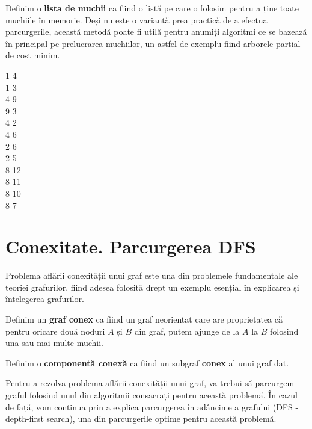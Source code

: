 \begin{definition}
    Definim o \textbf{lista de muchii} ca fiind o listă pe care o folosim pentru a ține toate muchiile în memorie. Deși nu este o variantă prea practică de a efectua parcurgerile, această metodă poate fi utilă pentru anumiți algoritmi ce se bazează în principal pe prelucrarea muchiilor, un astfel de exemplu fiind arborele parțial de cost minim. 
\end{definition}

\begin{raggedright}
1 4\\
1 3\\
4 9\\
9 3\\
4 2\\
4 6\\
2 6\\
2 5\\
8 12\\
8 11\\
8 10\\
8 7\\
\end{raggedright}

\section{Conexitate. Parcurgerea DFS}

Problema aflării conexității unui graf este una din problemele fundamentale ale teoriei grafurilor, fiind adesea folosită drept un exemplu esențial în explicarea și înțelegerea grafurilor. 

\begin{definition}
    Definim un \textbf{graf conex} ca fiind un graf neorientat care are proprietatea că pentru oricare două noduri $A$ și $B$ din graf, putem ajunge de la $A$ la $B$ folosind una sau mai multe muchii.
\end{definition}

\begin{definition}
    Definim o \textbf{componentă conexă} ca fiind un subgraf \textbf{conex} al unui graf dat.
\end{definition}

Pentru a rezolva problema aflării conexității unui graf, va trebui să parcurgem graful folosind unul din algoritmii consacrați pentru această problemă. În cazul de față, vom continua prin a explica parcurgerea în adâncime a grafului (DFS - depth-first search), una din parcurgerile optime pentru această problemă. 

